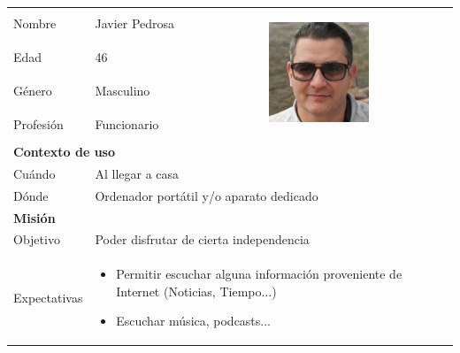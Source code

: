 \begin{table}[H]
	\centering
	\begin{tabular}{|l|l|l|} 
		\hline
		Nombre       & Javier Pedrosa & \multirow{4}{*}{
			\begin{minipage}[t]{0.4\textwidth}
				\begin{center}
					\includegraphics[height=3cm]{imagenes/Persona2.jpg}
				\end{center}
			\end{minipage}
		}                 \\ [2ex]
		\cline{1-2}
		Edad         & 46 &                                   \\ [2ex] 
		\cline{1-2}
		Género         & Masculino &                                   \\ [2ex]
		\cline{1-2}
		Profesión    & 
			\begin{minipage}[t]{0.3 \textwidth}
				Funcionario
			\end{minipage}
		 &                                   \\ [2ex] 
		\hline
		\multicolumn{3}{|l|}{{\cellcolor{lightblue}}\textbf{Contexto de uso}}               \\ 
		\hline
		Cuándo       & \multicolumn{2}{l|}{Al llegar a casa}                \\ 
		\hline
		Dónde        & \multicolumn{2}{l|}{Ordenador portátil y/o aparato dedicado}                \\ 
		\hline
		\multicolumn{3}{|l|}{{\cellcolor{lightblue}}\textbf{Misión}}                        \\ 
		\hline
		Objetivo     & \multicolumn{2}{l|}{Poder disfrutar de cierta independencia}                \\ 
		\hline
		Expectativas & \multicolumn{2}{l|}{
			\begin{minipage} [t] {0.7\textwidth}
				\begin{itemize}
					\item Permitir escuchar alguna información proveniente de Internet (Noticias, Tiempo...)
					\item Escuchar música, podcasts...
				\end{itemize}
			\end{minipage}
}
\end{tabular}
\end{table}
